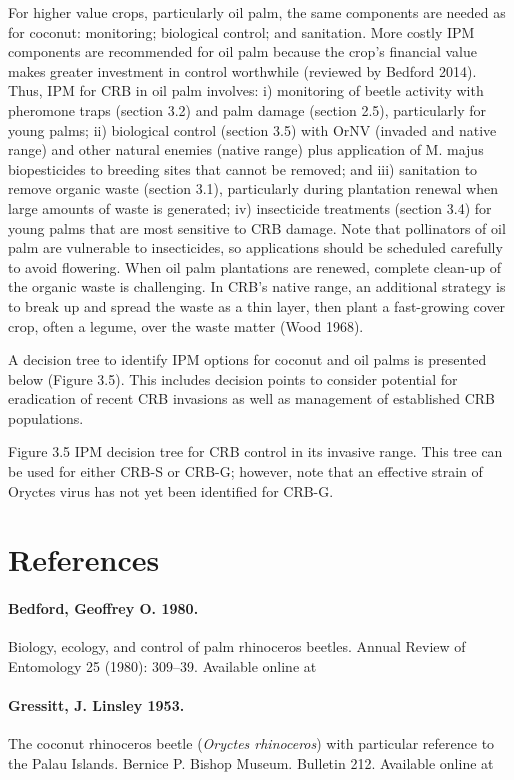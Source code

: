 \documentclass[twocolumn,letterpaper]{scrartcl}
\begin{document}
For higher value crops, particularly oil palm, the same components are needed as for coconut: monitoring; 
biological control; and sanitation. More costly IPM components are recommended for oil palm because the 
crop’s financial value makes greater investment in control worthwhile (reviewed by Bedford 2014). Thus, IPM for 
CRB in oil palm involves: i) monitoring of beetle activity with pheromone traps (section 3.2) and palm damage 
(section 2.5), particularly for young palms; ii) biological control (section 3.5) with OrNV (invaded and native 
range) and other natural enemies (native range) plus application of M. majus biopesticides to breeding sites 
that cannot be removed; and iii) sanitation to remove organic waste (section 3.1), particularly during plantation 
renewal when large amounts of waste is generated; iv) insecticide treatments (section 3.4) for young palms that 
are most sensitive to CRB damage. Note that pollinators of oil palm are vulnerable to insecticides, so applications 
should be scheduled carefully to avoid flowering. When oil palm plantations are renewed, complete clean-up 
of the organic waste is challenging. In CRB’s native range, an additional strategy is to break up and spread the 
waste as a thin layer, then plant a fast-growing cover crop, often a legume, over the waste matter (Wood 1968). 

A decision tree to identify IPM options for coconut and oil palms is presented below (Figure 3.5). This includes 
decision  points  to  consider  potential  for  eradication  of  recent  CRB  invasions  as  well  as  management  of 
established CRB populations. 

Figure 3.5   IPM decision tree for CRB control in its invasive range. This tree can be used for either CRB-S  
or CRB-G; however, note that an effective strain of Oryctes virus has not yet been identified for CRB-G. 

\newpage
\section*{References}

\paragraph{Bedford, Geoffrey O. 1980.} Biology, ecology, and control of palm rhinoceros beetles. Annual Review of Entomology 25 (1980): 309–39.
Available online at 

\paragraph{Gressitt, J. Linsley 1953.} The coconut rhinoceros beetle (\textit{Oryctes rhinoceros}) with particular reference to the Palau Islands. Bernice P. Bishop Museum. Bulletin 212. 
Available online at
\end{document}
